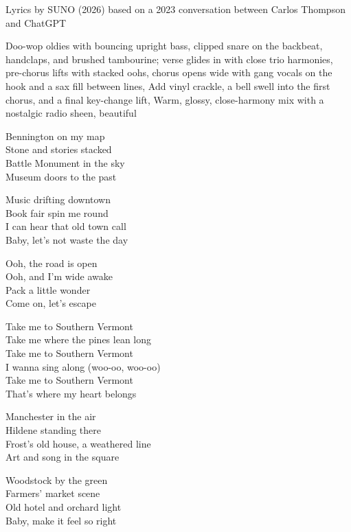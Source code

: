 
\begin{notes}
Lyrics by SUNO (2026) based on a 2023 conversation between Carlos Thompson and ChatGPT
\end{notes}
\begin{style}
Doo-wop oldies with bouncing upright bass, clipped snare on the backbeat, handclaps, and brushed tambourine; verse glides in with close trio harmonies, pre-chorus lifts with stacked oohs, chorus opens wide with gang vocals on the hook and a sax fill between lines, Add vinyl crackle, a bell swell into the first chorus, and a final key-change lift, Warm, glossy, close-harmony mix with a nostalgic radio sheen, beautiful
\end{style}
\begin{lyrics}
Bennington on my map\\
Stone and stories stacked\\
Battle Monument in the sky\\
Museum doors to the past

Music drifting downtown\\
Book fair spin me round\\
I can hear that old town call\\
Baby, let’s not waste the day

Ooh, the road is open\\
Ooh, and I’m wide awake\\
Pack a little wonder\\
Come on, let’s escape

Take me to Southern Vermont\\
Take me where the pines lean long\\
Take me to Southern Vermont\\
I wanna sing along
(woo-oo, woo-oo)\\
Take me to Southern Vermont\\
That’s where my heart belongs

Manchester in the air\\
Hildene standing there\\
Frost’s old house, a weathered line\\
Art and song in the square

Woodstock by the green\\
Farmers’ market scene\\
Old hotel and orchard light\\
Baby, make it feel so right


\end{lyrics}
